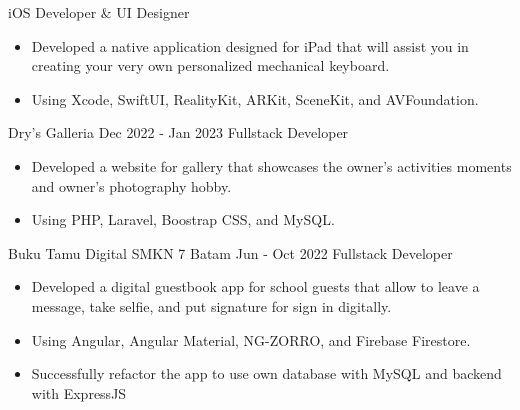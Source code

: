 \documentclass[9pt]{developercv}
\begin{document}
\begin{minipage}[t]{0.46\textwidth}
\begin{entrylist}
    		{iOS Developer \& UI Designer}
    		{
                    \begin{itemize}[noitemsep,topsep=0pt,parsep=0pt,partopsep=0pt, leftmargin=8pt]
                        \item Developed a native application designed for iPad that will assist you in creating your very own personalized mechanical keyboard.
    				\item Using Xcode, SwiftUI, RealityKit, ARKit, SceneKit, and AVFoundation.
                    \end{itemize} 
                }
    	\entry
    		{Dry's Galleria}
    		{Dec 2022 - Jan 2023}
    		{Fullstack Developer}
    		{
                    \begin{itemize}[noitemsep,topsep=0pt,parsep=0pt,partopsep=0pt, leftmargin=8pt]
                        \item Developed a website for gallery that showcases the owner's activities moments and owner's photography hobby.
    				\item Using PHP, Laravel, Boostrap CSS, and MySQL.
                    \end{itemize} 
                }
        \entry
    		{Buku Tamu Digital SMKN 7 Batam}
    		{Jun - Oct 2022}
    		{Fullstack Developer}
    		{
                    \begin{itemize}[noitemsep,topsep=0pt,parsep=0pt,partopsep=0pt, leftmargin=8pt]
                        \item Developed a digital guestbook app for school guests that allow to leave a message, take selfie, and put signature for sign in digitally.
    				\item Using Angular, Angular Material, NG-ZORRO, and Firebase Firestore.
                        \item Successfully refactor the app to use own database with MySQL and backend with ExpressJS
                    \end{itemize} 
                }
    \end{entrylist}
\end{minipage}
\hfill %
\end{document}
